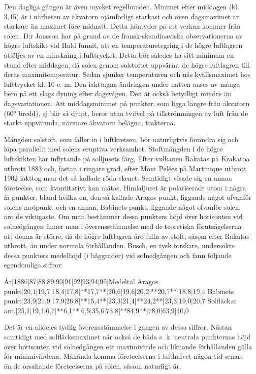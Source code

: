 \documentclass[a4paper, 12pt, oneside, swedish]{article}
\begin{document}
Den dagliga gången är även mycket regelbunden. Minimet efter middagen (kl. 3,45) är i närheten av äkvatorn ojämförligt starkast och även dagsmaximet är starkare än maximet före midnatt. Detta häntyder på att verkan kommer från solen. D:r Jansson har på grund av de fransk-skandinaviska observationerna av högre luftskikt vid Hald funnit, att en temperaturstegring i de högre luftlagren åtföljes av en minskning i lufttrycket. Detta bör således ha sitt minimum en stund efter middagen, då solen genom solstoftet uppvärmt de högre luftlagren till deras maximitemperatur. Sedan sjunker temperaturen och nås kvällsmaximet hos lufttrycket kl. 10 e. m. Den iakttagna ändringen under natten anses av många bero på ett slags dyning efter dagsvågen. Den är också betydligt mindre än dagsvariationen. Att middagsminimet på punkter, som ligga längre från äkvatorn (60° bredd), ej blir så djupt, beror utan tvifvel på tillströmningen av luft från de starkt uppvärmda, närmare äkvatorn belägna, trakterna.

Mängden solstoft, som faller in i luftkretsen, bör naturligtvis förändra sig och löpa parallellt med solens eruptiva verksamhet. Stoftmängden i de högre luftskikten har inflytande på solljusets färg. Efter vulkanen Rakatas på Krakatoa utbrott 1883 och, fastän i ringare grad, efter Mont Pelées på Martinique utbrott 1902 iakttog man det så kallade röda skenet. Samtidigt visade sig en annan företeelse, som kvantitativt kan mätas. Himlaljuset är polariseradt utom i några få punkter, bland hvilka en, den så kallade Aragos punkt, liggande något ofvanför solens motpunkt och en annan, Babinets punkt, liggande något ofvanför solen, äro de viktigaste. Om man bestämmer dessa punkters höjd över horisonten vid solnedgången finner man i överensstämmelse med de teoretiska förutsägelserna att denna är större, då de högre luftlagren äro fulla av stoft, såsom efter Rakatas utbrott, än under normala förhållanden. Busch, en tysk forskare, undersökte dessa punkters medelhöjd (i båggrader) vid solnedgången och fann följande egendomliga siffror:

År|1886|87|88|89|90|91|92|93|94|95|Medeltal  
Aragos punkt|20,1|19,7|18,4|17,8|**17,7**|20,6|19,6|20,2|**20,7**|18,8|19,4  
Babinets punkt|23,9|21,9|17,9|26,8|**15,4**|23,3|21,4|**24,2**|23,3|19,0|20,7  
Solfläckar ant.|25,1|19,1|6,7|**6,1**|6,5|35,6|73,8|**84,9**|78,0|63,9|40,0  

Det är en alldeles tydlig överensstämmelse i gången av dessa siffror. Nästan samtidigt med solfläcksmaximet når också de båda s. k. neutrala punkternas höjd över horisonten vid solnedgången ett maximivärde och liknande förhållanden gälla för minimivärdena. Måhända komma företeelserna i lufthafvet någon tid senare än de orsakande företeelserna på solen, såsom naturligt är.
\end{document}
